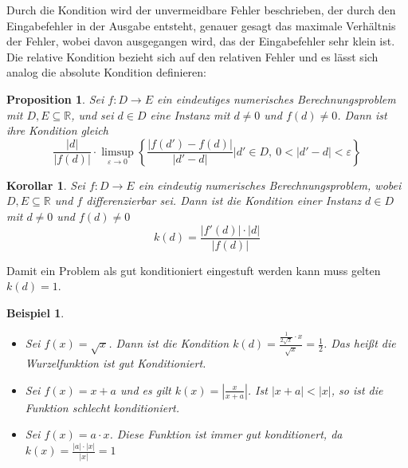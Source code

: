 \documentclass[12pt]{article}
\newcommand{\R}{\mathbb{R}} %
\newtheorem{beispiel}[satz]{Beispiel}
\newtheorem{proposition}[satz]{Proposition}
\newtheorem{korollar}[satz]{Korollar}
\begin{document}
\noindent Durch die Kondition wird der unvermeidbare Fehler beschrieben, der durch den Eingabefehler in der Ausgabe entsteht, genauer gesagt das maximale Verhältnis der Fehler, wobei davon ausgegangen wird, das der Eingabefehler sehr klein ist. \\ 
Die relative Kondition bezieht sich auf den relativen Fehler und es lässt sich analog die absolute Kondition definieren: 

\begin{proposition}
    Sei $f:D \to E$ ein eindeutiges numerisches Berechnungsproblem mit $D,E \subseteq \R$, und sei $d \in D$ eine Instanz mit $d \neq 0$ und $f(d) \neq 0$. Dann ist ihre Kondition gleich 
    \begin{equation*}
        \frac{|d|}{|f(d)|} \cdot \limsup_{\varepsilon \to 0} \left\{ \frac{|f(d')-f(d)|}{|d'-d|} | d'\in D, \: 0<|d'-d|< \varepsilon \right\}
    \end{equation*}
\end{proposition}

\begin{korollar}
    Sei $f: D \to E$ ein eindeutig numerisches Berechnungsproblem, wobei  $D,E \subseteq \R$ und $f$ differenzierbar sei. Dann ist die Kondition einer Instanz $d \in D$ mit $d \neq 0$ und $f(d) \neq 0$ 
    \begin{equation*}
        k(d) = \frac{|f'(d)| \cdot |d|}{|f(d)|}
    \end{equation*}
\end{korollar}
\vspace{\baselineskip}
\noindent Damit ein Problem als gut konditioniert eingestuft werden kann muss gelten $k(d) = 1$. 

\newpage

\begin{beispiel}
    \begin{itemize}
        \item Sei $f(x)= \sqrt{x}$. Dann ist die Kondition $k(d)= \frac{\frac{1}{2 \sqrt{x}} \cdot x}{\sqrt{x}}= \frac{1}{2}$. Das heißt die Wurzelfunktion ist gut Konditioniert. 
        \item Sei $f(x)= x+a$ und es gilt $k(x)= |\frac{x}{x+a}|$. Ist $|x+a|<|x|$, so ist die Funktion schlecht konditioniert. 
        \item Sei $f(x)= a \cdot x$. Diese Funktion ist immer gut konditionert, da $k(x)= \frac{|a| \cdot |x|}{|x|}=1$
    \end{itemize}
    \label{kondition}
\end{beispiel}
\end{document}
